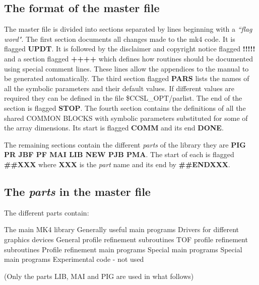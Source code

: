\documentclass[onecolumn,twoside,11pt,a4paper]{report}
\begin{document}
\subsection{The format of the master file}
The master file is divided into sections separated by lines beginning   with a
\emph{``flag word"}.  The first section documents all changes made to the mk4 code.
It is flagged \textbf{UPDT}. It is followed by the disclaimer and copyright notice
flagged \textbf{!!!!!} and a section flagged \textbf{++++} which defines how
routines should be documented using special comment lines. These lines allow the
appendices to the manual to be generated automatically. The third section flagged
\textbf{PARS} lists the names of all the symbolic parameters and their default
values. If different values are required they can be defined in the file 
\$CCSL\_OPT/parlist. The end of the section is flagged \textbf{STOP}. The fourth
section contains the definitions of all the shared COMMON BLOCKS with symbolic
parameters substituted for some of the array dimensions. Its start is flagged
\textbf{COMM} and its end \textbf{DONE}. 
\par
The remaining sections contain the different \emph{parts} of the library
they are \textbf{PIG PR JBF PF MAI LIB NEW PJB PMA}. The start of each 
is flagged \textbf{\#\#XXX}
where \textbf{XXX} is the \emph{part} name and its end by \textbf{\#\#ENDXXX}. 
\subsection{The \emph{parts} in the master file}
The different parts contain:
\begin{listdirectory}
     {The main MK4 library} 
     {Generally useful main programs} 
     {Drivers for different graphics devices} 
      {General profile refinement subroutines} 
      {TOF profile refinement subroutines} 
     {Profile refinement main programs} 
     {Special main programs} 
     {Special main programs} 
     {Experimental code - not used} 
\end{listdirectory}
  (Only the parts LIB, MAI and PIG are used in what follows)
\\
\end{document}
